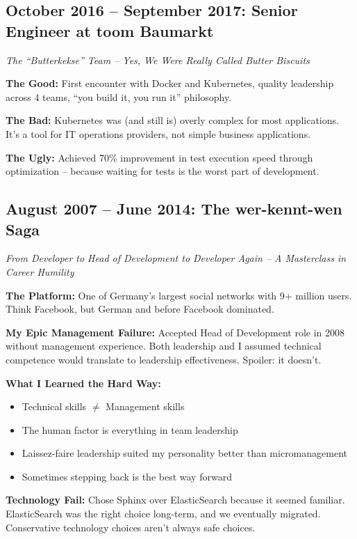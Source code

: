 \documentclass[10pt,a4paper]{article}
\begin{document}
\subsection{October 2016 -- September 2017: Senior Engineer at toom Baumarkt}
\textit{The ``Butterkekse'' Team -- Yes, We Were Really Called Butter Biscuits}

\textbf{The Good:} First encounter with Docker and Kubernetes, quality leadership across 4 teams, ``you build it, you run it'' philosophy.

\textbf{The Bad:} Kubernetes was (and still is) overly complex for most applications. It's a tool for IT operations providers, not simple business applications.

\textbf{The Ugly:} Achieved 70\% improvement in test execution speed through optimization -- because waiting for tests is the worst part of development.

\subsection{August 2007 -- June 2014: The wer-kennt-wen Saga}
\textit{From Developer to Head of Development to Developer Again -- A Masterclass in Career Humility}

\textbf{The Platform:} One of Germany's largest social networks with 9+ million users. Think Facebook, but German and before Facebook dominated.

\textbf{My Epic Management Failure:} Accepted Head of Development role in 2008 without management experience. Both leadership and I assumed technical competence would translate to leadership effectiveness. Spoiler: it doesn't.

\textbf{What I Learned the Hard Way:}
\begin{itemize}
    \item Technical skills $\neq$ Management skills
    \item The human factor is everything in team leadership
    \item Laissez-faire leadership suited my personality better than micromanagement
    \item Sometimes stepping back is the best way forward
\end{itemize}

\textbf{Technology Fail:} Chose Sphinx over ElasticSearch because it seemed familiar. ElasticSearch was the right choice long-term, and we eventually migrated. Conservative technology choices aren't always safe choices.
\end{document}
